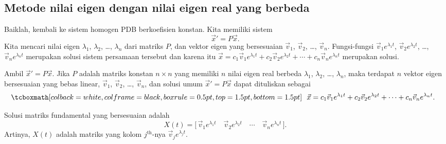 \subsection{Metode nilai eigen dengan nilai eigen real yang berbeda}

Baiklah\@, kembali ke sistem homogen PDB berkoefisien konstan.  Kita memiliki sistem
\begin{equation*}
{\vec{x}}' = P\vec{x} .
\end{equation*}
Kita mencari nilai eigen $\lambda_1$, $\lambda_2$, \ldots, $\lambda_n$
dari matriks $P$, dan vektor eigen yang bersesuaian
$\vec{v}_1$, $\vec{v}_2$, \ldots, $\vec{v}_n$.
Fungsi-fungsi
$\vec{v}_1 e^{\lambda_1 t}$,
$\vec{v}_2 e^{\lambda_2 t}$, \ldots,
$\vec{v}_n e^{\lambda_n t}$ merupakan solusi sistem persamaan tersebut dan karena itu
$
\vec{x} = c_1 \vec{v}_1 e^{\lambda_1 t} +
c_2 \vec{v}_2 e^{\lambda_2 t} + \cdots +
c_n \vec{v}_n e^{\lambda_n t}
$
merupakan solusi.

\begin{theorem}
Ambil ${\vec{x}}' = P\vec{x}$.  Jika $P$ adalah matriks konstan $n \times n$
yang
memiliki $n$ nilai eigen real berbeda $\lambda_1$, $\lambda_2$, \ldots, $\lambda_n$,
maka terdapat $n$ vektor eigen bersesuaian yang bebas linear,
$\vec{v}_1$, $\vec{v}_2$, \ldots, $\vec{v}_n$, dan solusi umum
${\vec{x}}' = P\vec{x}$
dapat dituliskan sebagai
\begin{equation*}
\mybxbg{~~
\vec{x} = c_1 \vec{v}_1 e^{\lambda_1 t} +
c_2 \vec{v}_2 e^{\lambda_2 t} + \cdots +
c_n \vec{v}_n e^{\lambda_n t} .
~~}
\end{equation*}
\end{theorem}

Solusi matriks fundamental yang bersesuaian adalah
\begin{equation*}
X(t) = \bigl[\, \vec{v}_1 e^{\lambda_1 t} \quad \vec{v}_2 e^{\lambda_2 t}
\quad \cdots \quad \vec{v}_n e^{\lambda_n t} \,\bigr].
\end{equation*}
Artinya, $X(t)$
adalah matriks yang kolom $j^{\text{th}}$-nya
$\vec{v}_j e^{\lambda_j t}$.

